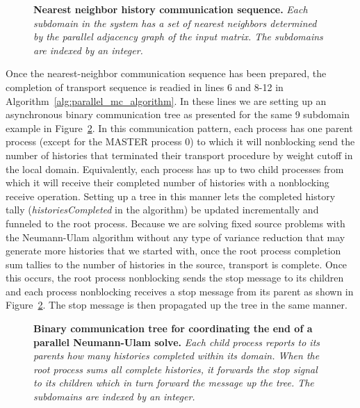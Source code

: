 \begin{figure}[t!]
  \begin{center}
    \scalebox{1.25}{  }
  \end{center}
  \caption{\textbf{Nearest neighbor history communication sequence.}
    \textit{Each subdomain in the system has a set of nearest
      neighbors determined by the parallel adjacency graph of the
      input matrix. The subdomains are indexed by an integer.}}
  \label{fig:nearest_neighbor_comm}
\end{figure}

Once the nearest-neighbor communication sequence has been prepared,
the completion of transport sequence is readied in lines 6 and 8-12 in
Algorithm~\ref{alg:parallel_mc_algorithm}. In these lines we are
setting up an asynchronous binary communication tree as presented for
the same 9 subdomain example in Figure~\ref{fig:binary_comm_tree}. In
this communication pattern, each process has one parent process
(except for the MASTER process 0) to which it will nonblocking send
the number of histories that terminated their transport procedure by
weight cutoff in the local domain. Equivalently, each process has up
to two child processes from which it will receive their completed
number of histories with a nonblocking receive operation. Setting up a
tree in this manner lets the completed history tally
(\textit{historiesCompleted} in the algorithm) be updated
incrementally and funneled to the root process. Because we are solving
fixed source problems with the Neumann-Ulam algorithm without any type
of variance reduction that may generate more histories that we started
with, once the root process completion sum tallies to the number of
histories in the source, transport is complete. Once this occurs, the
root process nonblocking sends the stop message to its children and
each process nonblocking receives a stop message from its parent as
shown in Figure~\ref{fig:binary_comm_tree}. The stop message is then
propagated up the tree in the same manner.

\begin{figure}[t!]
  \begin{center}
    \scalebox{1.0}{
       }
  \end{center}
  \caption{\textbf{Binary communication tree for coordinating the end
      of a parallel Neumann-Ulam solve.} \textit{Each child process
      reports to its parents how many histories completed within its
      domain. When the root process sums all complete histories, it
      forwards the stop signal to its children which in turn forward
      the message up the tree. The subdomains are indexed by an
      integer.}}
  \label{fig:binary_comm_tree}
\end{figure}

